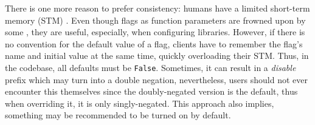 There is one more reason to prefer consistency: humans have a limited short-term memory (STM) \cite{miller1956magical}. Even though flags as function parameters are frowned upon by some \cite{martin2009clean}, they are useful, especially, when configuring libraries. However, if there is no convention for the default value of a flag, clients have to remember the flag's name and initial value at the same time, quickly overloading their STM. Thus, in the codebase, all defaults must be \texttt{False}. Sometimes, it can result in a \textit{disable} prefix which may turn into a double negation, nevertheless, users should not ever encounter this themselves since the doubly-negated version is the default, thus when overriding it, it is only singly-negated. This approach also implies, something may be recommended to be turned on by default.
